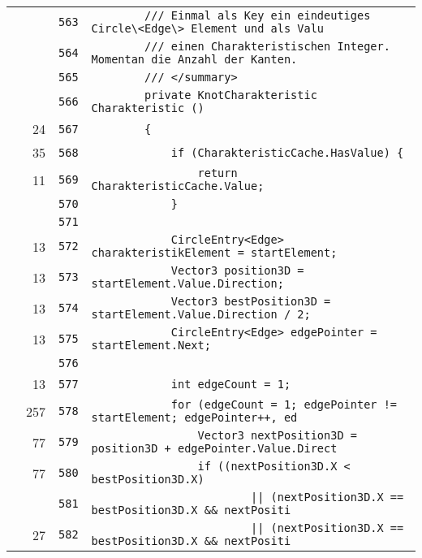 \documentclass[a4paper,10pt]{article}
\begin{document}
\begin{longtable}[l]{lrrl}
\cellcolor{gray} &  & \verb~563~ & \verb~        /// Einmal als Key ein eindeutiges Circle\<Edge\> Element und als Valu~\\
\cellcolor{gray} &  & \verb~564~ & \verb~        /// einen Charakteristischen Integer. Momentan die Anzahl der Kanten.~\\
\cellcolor{gray} &  & \verb~565~ & \verb~        /// </summary>~\\
\cellcolor{gray} &  & \verb~566~ & \verb~        private KnotCharakteristic Charakteristic ()~\\
\cellcolor{green} & 24 & \verb~567~ & \verb~        {~\\
\cellcolor{green} & 35 & \verb~568~ & \verb~            if (CharakteristicCache.HasValue) {~\\
\cellcolor{green} & 11 & \verb~569~ & \verb~                return CharakteristicCache.Value;~\\
\cellcolor{gray} &  & \verb~570~ & \verb~            }~\\
\cellcolor{gray} &  & \verb~571~ & \verb~~\\
\cellcolor{green} & 13 & \verb~572~ & \verb~            CircleEntry<Edge> charakteristikElement = startElement;~\\
\cellcolor{green} & 13 & \verb~573~ & \verb~            Vector3 position3D = startElement.Value.Direction;~\\
\cellcolor{green} & 13 & \verb~574~ & \verb~            Vector3 bestPosition3D = startElement.Value.Direction / 2;~\\
\cellcolor{green} & 13 & \verb~575~ & \verb~            CircleEntry<Edge> edgePointer = startElement.Next;~\\
\cellcolor{gray} &  & \verb~576~ & \verb~~\\
\cellcolor{green} & 13 & \verb~577~ & \verb~            int edgeCount = 1;~\\
\cellcolor{green} & 257 & \verb~578~ & \verb~            for (edgeCount = 1; edgePointer != startElement; edgePointer++, ed~\\
\cellcolor{green} & 77 & \verb~579~ & \verb~                Vector3 nextPosition3D = position3D + edgePointer.Value.Direct~\\
\cellcolor{green} & 77 & \verb~580~ & \verb~                if ((nextPosition3D.X < bestPosition3D.X)~\\
\cellcolor{gray} &  & \verb~581~ & \verb~                        || (nextPosition3D.X == bestPosition3D.X && nextPositi~\\
\cellcolor{green} & 27 & \verb~582~ & \verb~                        || (nextPosition3D.X == bestPosition3D.X && nextPositi~\\

\end{longtable}
\end{document}
